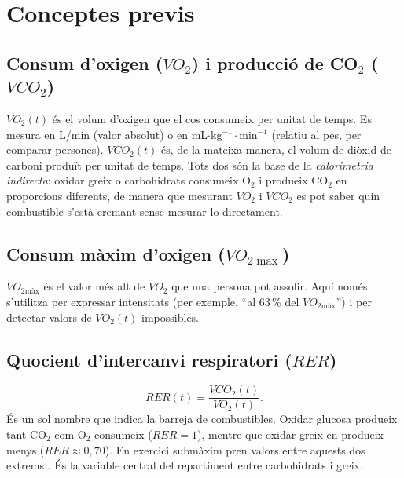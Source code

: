 \documentclass[10pt,a4paper]{article}
\newcommand{\smax}{{\scriptscriptstyle\text{màx}}}
\newcommand{\VO}{\ensuremath{\mathit{VO}_2}}               %
\newcommand{\VCO}{\ensuremath{\mathit{VCO}_2}}
\newcommand{\VOmax}{\ensuremath{\mathit{VO}_{2\smax}}}
\newcommand{\RER}{\ensuremath{\mathit{RER}}}
\begin{document}
\section{Conceptes previs}\label{sec:conceptes}

\subsection{Consum d'oxigen (\texorpdfstring{$\mathit{VO}_2$}{VO2}) i producció de
CO\texorpdfstring{$_2$}{2} (\texorpdfstring{$\mathit{VCO}_2$}{VCO2})}\label{sec:gasos}
$\VO(t)$ és el volum d'oxigen que el cos consumeix per unitat de temps. Es mesura en
L/min (valor absolut) o en mL$\cdot$kg$^{-1}\cdot$min$^{-1}$ (relatiu al pes, per comparar
persones). $\VCO(t)$ és, de la mateixa manera, el volum de diòxid de carboni produït per
unitat de temps. Tots dos són la base de la \emph{calorimetria indirecta}: oxidar greix o
carbohidrats consumeix O$_2$ i produeix CO$_2$ en proporcions diferents, de manera que
mesurant $\VO$ i $\VCO$ es pot saber quin combustible s'està cremant sense mesurar-lo
directament.

\subsection{Consum màxim d'oxigen (\texorpdfstring{$\mathit{VO}_{2\max}$}{VO2max})}
$\VOmax$ és el valor més alt de $\VO$ que una persona pot assolir. Aquí només s'utilitza
per expressar intensitats (per exemple, ``al 63\,\% del $\VOmax$'') i per detectar valors
de $\VO(t)$ impossibles.

\subsection{Quocient d'intercanvi respiratori (\texorpdfstring{$\mathit{RER}$}{RER})}
\begin{equation}
  \RER(t)=\frac{\VCO(t)}{\VO(t)} .
  \label{eq:rer-def}
\end{equation}
És un sol nombre que indica la barreja de combustibles. Oxidar glucosa produeix tant
CO$_2$ com O$_2$ consumeix ($\RER=1$), mentre que oxidar greix en produeix menys
($\RER\approx0{,}70$). En exercici submàxim pren valors entre aquests dos extrems
\citep{peronnet1991}. És la variable central del repartiment entre carbohidrats i greix.
\end{document}
